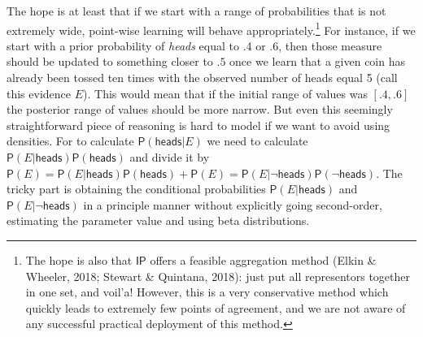 \documentclass[
  10pt,
  dvipsnames,enabledeprecatedfontcommands]{scrartcl}
\newcommand{\pr}[1]{\mathsf{P}(#1)}
\newcommand{\s}[1]{\mbox{$\mathsf{#1}$}}
\begin{document}
The hope is at least that if we start with a range of probabilities that
is not extremely wide, point-wise learning will behave
appropriately.\footnote{The hope is also that \s{IP} offers a feasible
  aggregation method (Elkin \& Wheeler, 2018; Stewart \& Quintana,
  2018): just put all representors together in one set, and voil'a!
  However, this is a very conservative method which quickly leads to
  extremely few points of agreement, and we are not aware of any
  successful practical deployment of this method.} For instance, if we
start with a prior probability of \emph{heads} equal to .4 or .6, then
those measure should be updated to something closer to \(.5\) once we
learn that a given coin has already been tossed ten times with the
observed number of heads equal 5 (call this evidence \(E\)). This would
mean that if the initial range of values was \([.4,.6]\) the posterior
range of values should be more narrow. But even this seemingly
straightforward piece of reasoning is hard to model if we want to avoid
using densities. For to calculate \(\pr{\s{heads}\vert E}\) we need to
calculate \(\pr{E \vert \s{heads}}\pr{\s{heads}}\) and divide it by
\(\pr{E} = \pr{E \vert \s{heads}}\pr{\s{heads}} + \pr{E} = \pr{E \vert \neg \s{heads}}\pr{\neg \s{heads}}\).
The tricky part is obtaining the conditional probabilities
\(\pr{E \vert \s{heads}}\) and \(\pr{E \vert \neg \s{heads}}\) in a
principle manner without explicitly going second-order, estimating the
parameter value and using beta distributions.
\end{document}
